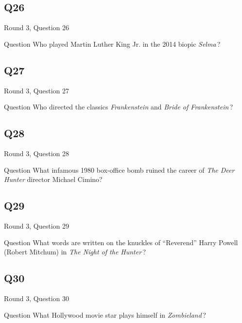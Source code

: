 \documentclass[11pt]{beamer}
\begin{document}
\subsection*{Q26}
\begin{frame}[t]{Round 3, Question 26}
  \vspace{2em}
  \begin{block}{Question}
    Who played Martin Luther King Jr. in the 2014 biopic \emph{Selma}\,?
  \end{block}
\end{frame}


\subsection*{Q27}
\begin{frame}[t]{Round 3, Question 27}
  \vspace{2em}
  \begin{block}{Question}
    Who directed the classics \emph{Frankenstein} and \emph{Bride of Frankenstein}\,?
  \end{block}
\end{frame}


\subsection*{Q28}
\begin{frame}[t]{Round 3, Question 28}
  \vspace{2em}
  \begin{block}{Question}
    What infamous 1980 box-office bomb ruined the career of \emph{The Deer Hunter} director Michael Cimino?
  \end{block}
\end{frame}


\subsection*{Q29}
\begin{frame}[t]{Round 3, Question 29}
  \vspace{2em}
  \begin{block}{Question}
    What words are written on the knuckles of ``Reverend'' Harry Powell (Robert Mitchum) in \emph{The Night of the Hunter}\,?
  \end{block}
\end{frame}


\subsection*{Q30}
\begin{frame}[t]{Round 3, Question 30}
  \vspace{2em}
  \begin{block}{Question}
    What Hollywood movie star plays himself in \emph{Zombieland}\,?
  \end{block}
\end{frame}
\end{document}
